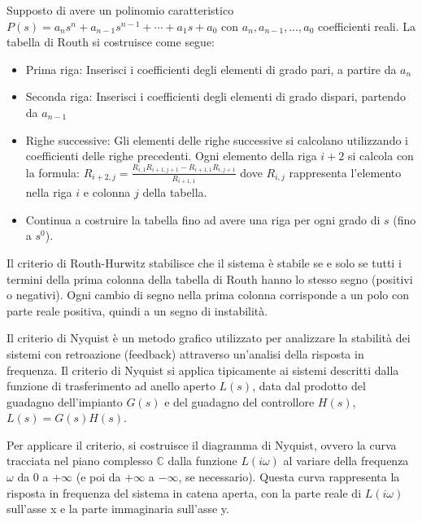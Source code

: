 Supposto di avere un polinomio caratteristico \(P(s)=a_n s^n+a_{n-1}s^{n-1}+⋯+a_1 s+a_0\) con \(a_n,a_{n-1},…,a_0\) coefficienti reali. La tabella di Routh si costruisce come segue:

\begin{itemize}
    \item Prima riga: Inserisci i coefficienti degli elementi di grado pari, a partire da \(a_n\)
    \item Seconda riga: Inserisci i coefficienti degli elementi di grado dispari, partendo da \(a_{n-1}\)
    \item Righe successive: Gli elementi delle righe successive si calcolano utilizzando i coefficienti delle righe precedenti. Ogni elemento della riga \(i+2\) si calcola con la formula: \(R_{i+2,j} =\frac{ R_{i,1} R_{i+1,j+1} - R_{i+1,1} R_{i,j+1}}{R_{i+1,1}}\)
    dove \(R_{i,j}\) rappresenta l'elemento nella riga \(i\) e colonna \(j\) della tabella.
    \item Continua a costruire la tabella fino ad avere una riga per ogni grado di \(s\) (fino a \(s^0\)).
\end{itemize}


Il criterio di Routh-Hurwitz stabilisce che il sistema è stabile se e solo se tutti i termini della prima colonna della tabella di Routh hanno lo stesso segno (positivi o negativi).
Ogni cambio di segno nella prima colonna corrisponde a un polo con parte reale positiva, quindi a un segno di instabilità.

Il criterio di Nyquist è un metodo grafico utilizzato per analizzare la stabilità dei sistemi con retroazione (feedback) attraverso un'analisi della risposta in frequenza.
Il criterio di Nyquist si applica tipicamente ai sistemi descritti dalla funzione di trasferimento ad anello aperto \(L(s)\), data dal prodotto del guadagno dell'impianto \(G(s)\) e del guadagno del controllore \(H(s)\), \(L(s)=G(s)H(s)\).

Per applicare il criterio, si costruisce il diagramma di Nyquist, ovvero la curva tracciata nel piano complesso \(\mathbb{C}\) dalla funzione \(L(i\omega)\) al variare della frequenza \(\omega\) da 0 a \(+\infty\) (e poi da \(+\infty\) a \(-\infty\), se necessario). Questa curva rappresenta la risposta in frequenza del sistema in catena aperta, con la parte reale di \(L(i\omega)\) sull'asse x e la parte immaginaria sull'asse y.

